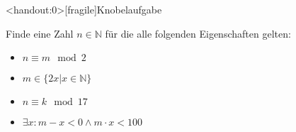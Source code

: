 {
\begin{frame}<handout:0>[fragile]{Knobelaufgabe}
	\footnotesize
	\begin{block}{Finde eine Zahl $n \in \mathbb N$ für die alle folgenden Eigenschaften gelten:}
		\begin{multicols}{2}
			\begin{itemize}
				\item $n \equiv m \mod 2$
				\item $m \in \{2x | x \in \mathbb N\}$
				\item $n \equiv k \mod 17$
				\item  $\exists x: m-x < 0 \wedge m\cdot x < 100$
			\end{itemize}
		\end{multicols}
	\end{block}

\end{frame}

}